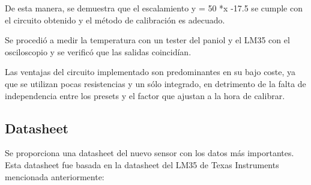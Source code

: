 \documentclass[../../main.tex]{subfiles}
\begin{document}
De esta manera, se demuestra que el escalamiento y = 50 *x -17.5 se cumple con el circuito obtenido y el método de calibración es adecuado. \par
Se procedió a medir la temperatura con un tester del paniol y el LM35 con el osciloscopio y se verificó que las salidas coincidían.\par
Las ventajas del circuito implementado son predominantes en su bajo coste, ya que se utilizan pocas resistencias y un sólo integrado, en detrimento de la falta de independencia entre los presets y el factor que ajustan a la hora de calibrar. 

\subsection{Datasheet}

Se proporciona una datasheet del nuevo sensor con los datos más importantes. Esta datasheet fue basada en la datasheet del LM35 de Texas Instruments mencionada anteriormente:


\end{document}
